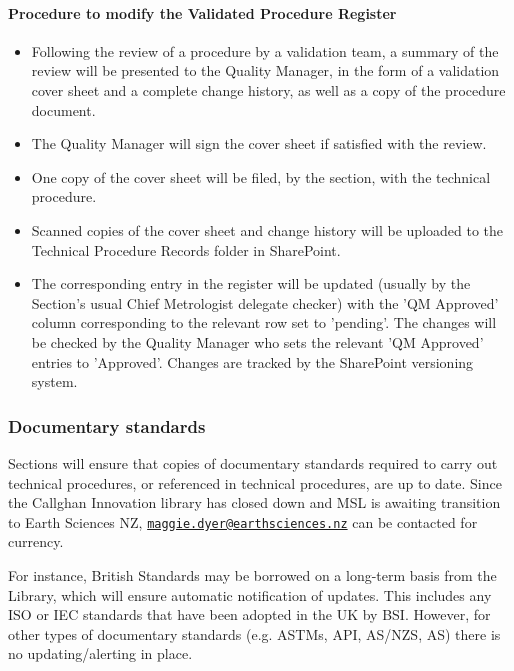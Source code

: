 \paragraph{Procedure to modify the Validated Procedure Register}
\begin{itemize}
\item Following the review of a procedure by a validation team, a summary of the review will be presented to the Quality Manager, in the form of a validation cover sheet and a complete change history, as well as a copy of the procedure document.
\item The Quality Manager will sign the cover sheet if satisfied with the review.
\item One copy of the cover sheet will be filed, by the section, with the technical procedure. 
\item Scanned copies of the cover sheet and change history will be uploaded to the Technical Procedure Records folder in SharePoint.
\item The corresponding entry in the register will be updated (usually by the Section's usual Chief Metrologist delegate checker) with the 'QM Approved' column corresponding to the relevant row set to 'pending'.  The changes will be checked by the Quality Manager who sets the relevant 'QM Approved' entries to 'Approved'.  Changes are tracked by the SharePoint versioning system.
\end{itemize}

\subsubsection{Documentary standards}
Sections will ensure that copies of documentary standards required to carry out technical procedures, or referenced in technical procedures, are up to date. 
Since the Callghan Innovation library has closed down and MSL is awaiting transition to Earth Sciences NZ, \href{mailto:maggie.dyer@earthsciences.nz}{\texttt{maggie.dyer@earthsciences.nz}} can be contacted for currency.

For instance, British Standards may be borrowed on a long-term basis from the Library, which will ensure automatic notification of updates. This includes any ISO or IEC standards that have been adopted in the UK by BSI. However, for other types of documentary standards (e.g. ASTMs, API, AS/NZS, AS) there is no updating/alerting in place.